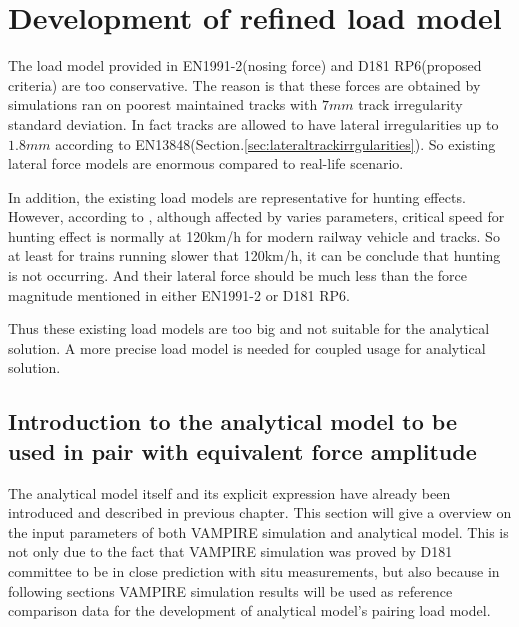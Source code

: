\section{Development of refined load model}\label{sec:refinedloadmodel}

The load model provided in EN1991-2(nosing force) and D181 RP6(proposed criteria) are too conservative. The reason is that these forces are obtained by simulations ran on poorest maintained tracks with $7mm$ track irregularity standard deviation. In fact tracks are allowed to have lateral irregularities up to $1.8mm$ according to EN13848(Section.\ref{sec:lateraltrackirrgularities}). So existing lateral force models are enormous compared to real-life scenario. 

In addition, the existing load models are representative for hunting effects\cite[Proposed criteria]{d181}. However, according to \cite{majka2008effects}, although affected by varies parameters, critical speed for hunting effect is normally at 120km/h for modern railway vehicle and tracks. So at least for trains running slower that 120km/h, it can be conclude that hunting is not occurring. And their lateral force should be much less than the force magnitude mentioned in either EN1991-2 or D181 RP6.

Thus these existing load models are too big and not suitable for the analytical solution. A more precise load model is needed for coupled usage for analytical solution.

\subsection{Introduction to the analytical model to be used in pair with equivalent force amplitude}

The analytical model itself and its explicit expression have already been introduced and described in previous chapter. This section will give a overview on the input parameters of both VAMPIRE simulation and analytical model. This is not only due to the fact that VAMPIRE simulation was proved by D181 committee to be in close prediction with situ measurements, but also because in following sections VAMPIRE simulation results will be used as reference comparison data for the development of analytical model's pairing load model. 

